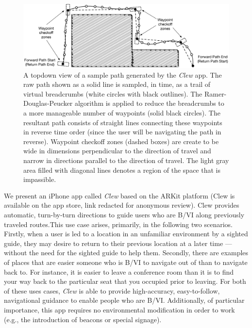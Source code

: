 \documentclass[chi_draft]{sigchi}
\newcommand{\BVI}{B/VI\xspace}
\begin{document}
\begin{figure}
\begin{center}
\includegraphics[width=0.9\linewidth]{Figures/samplepath}
\end{center}
\caption{A topdown view of a sample path generated by the \emph{Clew} app.  The raw path shown as a solid line is sampled, in time, as a trail of virtual breadcrumbs (white circles with black outlines).  The Ramer-Douglas-Peucker algorithm is applied to reduce the breadcrumbs to a more manageable number of waypoints (solid black circles).  The resultant path consists of straight lines connecting these waypoints in reverse time order (since the user will be navigating the path in reverse).  Waypoint checkoff zones (dashed boxes) are create to be wide in dimensions perpendicular to the direction of travel and narrow in directions parallel to the direction of travel.  The light gray area filled with diagonal lines denotes a region of the space that is impassible.\label{fig:samplepath}}
\end{figure}

We present an iPhone app called \emph{Clew} based on the ARKit platform (Clew is available on the app store, link redacted for anonymous review).  Clew provides automatic, turn-by-turn directions to guide users who are \BVI along previously traveled routes.This use case arises, primarily, in the following two scenarios.  Firstly, when a user is led to a location in an unfamiliar environment by a sighted guide, they may desire to return to their previous location at a later time --- without the need for the sighted guide to help them.  Secondly, there are examples of places that are easier someone who is \BVI to navigate out of than to navigate back to.  For instance, it is easier to leave a conference room than it is to find your way back to the particular seat that you occupied prior to leaving.  For both of these uses cases, \emph{Clew} is able to provide high-accuracy, easy-to-follow, navigational guidance to enable people who are \BVI.  Additionally, of particular importance, this app requires no environmental modification in order to work (e.g., the introduction of beacons or special signage).  
\end{document}
